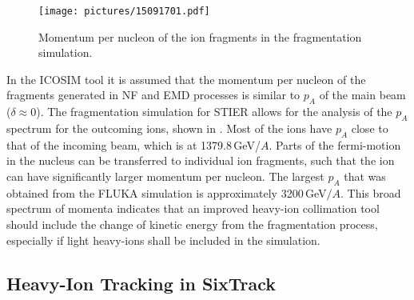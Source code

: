   \begin{figure}[t]
  \centering
  \texttt{[image: pictures/15091701.pdf]}
  \caption{Momentum per nucleon of the ion fragments in the fragmentation simulation. }  
  \label{pic:15091701}
  \end{figure}







In the ICOSIM tool it is assumed that the momentum per nucleon of the fragments generated in NF and EMD processes is similar to $p_A$ of the main beam ($\delta \approx 0$). The fragmentation simulation for STIER allows for the analysis of the $p_A$ spectrum for the outcoming ions, shown in . Most of the ions have $p_A$ close to that of the incoming \lead beam, which is at 1379.8$\,$GeV/$A$. Parts of the fermi-motion in the nucleus can be transferred to individual ion fragments, such that the ion can have significantly larger momentum per nucleon. The largest $p_A$ that was obtained from the FLUKA simulation is approximately 3200$\,$GeV$/A$. This broad spectrum of momenta indicates that an improved heavy-ion collimation tool should include the change of kinetic energy from the fragmentation process, especially if light heavy-ions shall be included in the simulation.











\subsection{Heavy-Ion Tracking in SixTrack}

